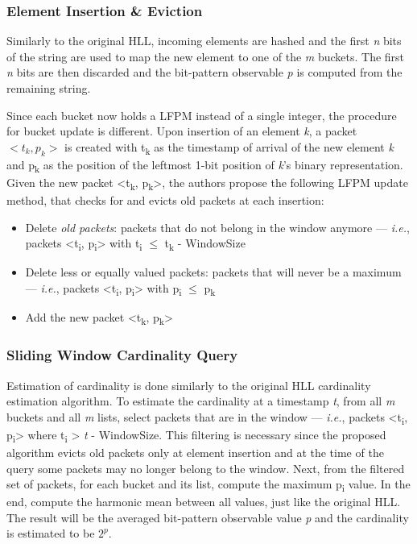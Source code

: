 \subsubsection*{Element Insertion \& Eviction}
Similarly to the original HLL, incoming elements are hashed and the first \textit{n} bits of the string are used to map the new element to one of the \textit{m} buckets. The first \textit{n} bits are then discarded and the bit-pattern observable \textit{p} is computed from the remaining string. 

Since each bucket now holds a LFPM instead of a single integer, the procedure for bucket update is different. Upon insertion of an element \textit{k}, a packet $<t_k, p_k>$ is created with t\textsubscript{k} as the timestamp of arrival of the new element \textit{k} and p\textsubscript{k} as the position of the leftmost 1-bit position of \textit{k}'s binary representation. Given the new packet <t\textsubscript{k}, p\textsubscript{k}>, the authors propose the following LFPM update method, that checks for and evicts old packets at each insertion:

\begin{itemize}
    \item Delete \textit{old packets}: packets that do not belong in the window anymore --- \textit{i.e.}, packets <t\textsubscript{i}, p\textsubscript{i}> with t\textsubscript{i} $\leq$ t\textsubscript{k} - WindowSize 
    
    \item Delete less or equally valued packets: packets that will never be a maximum --- \textit{i.e.}, packets <t\textsubscript{i}, p\textsubscript{i}> with p\textsubscript{i} $\leq$ p\textsubscript{k}
    
    \item Add the new packet <t\textsubscript{k}, p\textsubscript{k}>
\end{itemize}


\subsubsection*{Sliding Window Cardinality Query} 

Estimation of cardinality is done similarly to the original HLL cardinality estimation algorithm. To estimate the cardinality at a timestamp \textit{t}, from all \textit{m} buckets and all \textit{m} lists, select packets that are in the window --- \textit{i.e.}, packets <t\textsubscript{i}, p\textsubscript{i}> where t\textsubscript{i} > \textit{t} - WindowSize. This filtering is necessary since the proposed algorithm evicts old packets only at element insertion and at the time of the query some packets may no longer belong to the window. Next, from the filtered set of packets, for each bucket and its list, compute the maximum p\textsubscript{i} value. In the end, compute the harmonic mean between all values, just like the original HLL. The result will be the averaged bit-pattern observable value \textit{p} and the cardinality is estimated to be $2^\textit{p}$.


